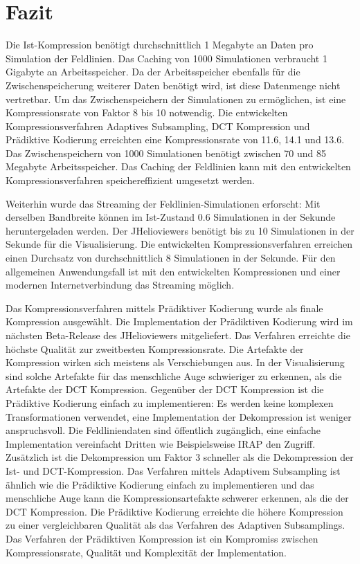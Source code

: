 \section{Fazit}
Die Ist-Kompression benötigt durchschnittlich 1 Megabyte an Daten pro Simulation der Feldlinien. Das Caching von 1000 Simulationen verbraucht 1 Gigabyte an Arbeitsspeicher. Da der Arbeitsspeicher ebenfalls für die Zwischenspeicherung weiterer Daten benötigt wird, ist diese Datenmenge nicht vertretbar. Um das Zwischenspeichern der Simulationen zu ermöglichen, ist eine Kompressionsrate von Faktor 8 bis 10 notwendig. Die entwickelten Kompressionsverfahren Adaptives Subsampling, DCT Kompression und Prädiktive Kodierung erreichten eine Kompressionsrate von 11.6, 14.1 und 13.6. Das Zwischenspeichern von 1000 Simulationen benötigt zwischen 70 und 85 Megabyte Arbeitsspeicher. Das Caching der Feldlinien kann mit den entwickelten Kompressionsverfahren speichereffizient umgesetzt werden.

Weiterhin wurde das Streaming der Feldlinien-Simulationen erforscht: Mit derselben Bandbreite können im Ist-Zustand 0.6 Simulationen in der Sekunde heruntergeladen werden. Der JHelioviewers benötigt bis zu 10 Simulationen in der Sekunde für die Visualisierung. Die entwickelten Kompressionsverfahren erreichen einen Durchsatz von durchschnittlich 8 Simulationen in der Sekunde. Für den allgemeinen Anwendungsfall ist mit den entwickelten Kompressionen und einer modernen Internetverbindung das Streaming möglich.

Das Kompressionsverfahren mittels Prädiktiver Kodierung wurde als finale Kompression ausgewählt. Die Implementation der Prädiktiven Kodierung wird im nächsten Beta-Release des JHelioviewers mitgeliefert. Das Verfahren erreichte die höchste Qualität zur zweitbesten Kompressionsrate. Die Artefakte der Kompression wirken sich meistens als Verschiebungen aus. In der Visualisierung sind solche Artefakte für das menschliche Auge schwieriger zu erkennen, als die Artefakte der DCT Kompression. Gegenüber der DCT Kompression ist die Prädiktive Kodierung einfach zu implementieren: Es werden keine komplexen Transformationen verwendet, eine Implementation der Dekompression ist weniger anspruchsvoll. Die Feldliniendaten sind öffentlich zugänglich, eine einfache Implementation vereinfacht Dritten wie Beispielsweise IRAP \cite{website:irap} den Zugriff. Zusätzlich ist die Dekompression um Faktor 3 schneller als die Dekompression der Ist- und DCT-Kompression. Das Verfahren mittels Adaptivem Subsampling ist ähnlich wie die Prädiktive Kodierung einfach zu implementieren und das menschliche Auge kann die Kompressionsartefakte schwerer erkennen, als die der DCT Kompression. Die Prädiktive Kodierung erreichte die höhere Kompression zu einer vergleichbaren Qualität als das Verfahren des Adaptiven Subsamplings. Das Verfahren der Prädiktiven Kompression ist ein Kompromiss zwischen Kompressionsrate, Qualität und Komplexität der Implementation.

